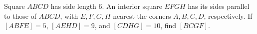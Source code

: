 Square $ABCD$ has side length $6$. An interior square $EFGH$ has its sides parallel to those of $ABCD$, with $E,F,G,H$ nearest the corners $A,B,C,D$, respectively. If $[ABFE]=5$, $[AEHD]=9$, and $[CDHG]=10$, find $[BCGF]$.
